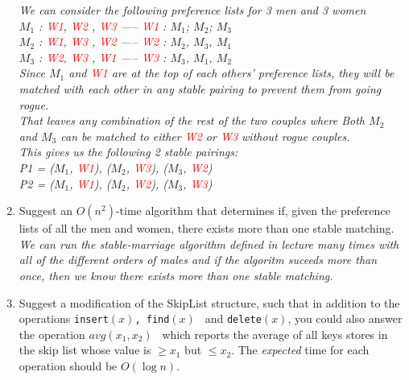 \documentclass[11pt,epic,leqno,eepic,psfig,]{article}
\newcommand{\ans}[1]{{\color{brown}{\bf\Large Answer:} \sl  #1 \color{black}}}
\renewcommand{\i}{\item}
\begin{document}
\begin{enumerate}
\ans{We can consider the following preference lists for 3 men and 3 women
\\$M_1$ : \textcolor{red}{W1}, \textcolor{red}{W2} , \textcolor{red}{W3}  -----  \textcolor{red}{W1} : $M_1$; $M_2$; $M_3$
\\$M_2$ : \textcolor{red}{W1}, \textcolor{red}{W3} , \textcolor{red}{W2}  -----  \textcolor{red}{W2}  : $M_2$, $M_3$, $M_1$
\\$M_3$ : \textcolor{red}{W2}, \textcolor{red}{W3} , \textcolor{red}{W1}  -----  \textcolor{red}{W3}  : $M_3$, $M_1$, $M_2$
\\Since $M_1$ and  \textcolor{red}{W1}  are at the top of each others' preference lists, they will be matched with each other in any stable pairing to prevent them from going rogue.
\\That leaves any combination of the rest of the two couples where Both $M_2$ and $M_3$ can be matched to either \textcolor{red}{W2} or \textcolor{red}{W3} without rogue couples.
\\ This gives us the following 2 stable pairings:
\\ P1 = ($M_1$, \textcolor{red}{W1}), ($M_2$, \textcolor{red}{W3}), ($M_3$, \textcolor{red}{W2})
\\ P2 = ($M_1$, \textcolor{red}{W1}), ($M_2$, \textcolor{red}{W2}), ($M_3$, \textcolor{red}{W3})}

 \i Suggest an $O(n^2)$-time algorithm that determines if, given the preference lists of all the men and women, there exists more than one stable matching.
\\\ans{We can run the stable-marriage algorithm defined in lecture many times with all of the different orders of males and if the algoritm suceeds more than once, then we know there exists more than one stable matching.}

  \i Suggest a modification of the SkipList structure, such that in addition to the operations
 { \tt insert$(x)$, find$(x)$ } and {\tt delete$(x)$}, you could also answer the operation {\tt $avg(x_1, x_2)$ } which reports the average of all keys stores in the skip list whose value is $\geq x_1$ but $\leq x_2$.
 The {\em expected}  time for each operation should be $O(\log n)$.



\end{enumerate}
\end{document}
